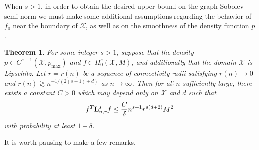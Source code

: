 \documentclass{article}
\newcommand{\1}{\mathbf{1}}
\newcommand{\Lap}{{\bf L}}
\newcommand{\Xset}{\mathcal{X}}
\theoremstyle{alden}
\theoremstyle{aldenthm}
\newtheorem{theorem}{Theorem}
\theoremstyle{definition}
\theoremstyle{remark}
\begin{document}
When $s > 1$, in order to obtain the desired upper bound on the graph Sobolev semi-norm we must make some additional assumptions regarding the behavior of $f_0$ near the boundary of $\Xset$, as well as on the smoothness of the density function $p$.
\begin{theorem}
	\label{thm:graph_sobolev_seminorm}
	For some integer $s > 1$, suppose that the density $p \in C^{s - 1}(\Xset,p_{\max})$ and $f \in H_0^s(\Xset,M)$, and additionally that the domain $\Xset$ is Lipschitz. Let $r = r(n)$ be a sequence of connectivity radii satisfying $r(n) \to 0$ and $r(n) \gtrsim n^{-1/(2(s - 1) +d)}$ as $n \to \infty$. Then for all $n$ sufficiently large, there exists a constant $C > 0$ which may depend only on $\Xset$ and $d$ such that
	\begin{equation}
	\label{eqn:graph_sobolev_seminorm}
	f^T \Lap_{n,r}^s f \leq \frac{C}{\delta} n^{s + 1} r^{s(d + 2)}M^2
	\end{equation}
	with probability at least $1 - \delta$.
\end{theorem}
It is worth pausing to make a few remarks.
\end{document}
